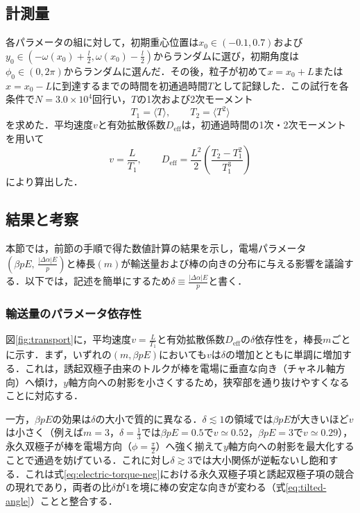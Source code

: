 \documentclass[dvipdfmx]{ampbt}
\begin{document}
  \subsection{計測量}
  各パラメータの組に対して，初期重心位置は$x_0\in(-0.1,0.7)$および$y_0\in(-\omega(x_0)+\frac{l}{2},\omega(x_0)-\frac{l}{2})$からランダムに選び，初期角度は$\phi_0\in(0,2\pi)$からランダムに選んだ．その後，粒子が初めて$x=x_0+L$または$x=x_0-L$に到達するまでの時間を初通過時間$T$として記録した．この試行を各条件で$N=3.0\times10^4$回行い，$T$の1次および2次モーメント
  \begin{equation}
    T_1=\langle T\rangle,\qquad
    T_2=\langle T^2\rangle
  \end{equation}
  を求めた．平均速度$v$と有効拡散係数$D_{\mathrm{eff}}$は，初通過時間の1次・2次モーメントを用いて\cite{schmid2008}
  \begin{equation}
    v=\frac{L}{T_1},\qquad
    D_{\mathrm{eff}}
    =
    \frac{L^2}{2}
    \left(
    \frac{T_2-T_1^2}{T_1^3}
    \right)
  \end{equation}
  により算出した．

  \subsection{結果と考察}
  \label{subsec:results}
  本節では，前節の手順で得た数値計算の結果を示し，電場パラメータ$\left(\beta pE,\,\frac{|\Delta\alpha|E}{p}\right)$と棒長$(m)$が輸送量および棒の向きの分布に与える影響を議論する．以下では，記述を簡単にするため$\delta\equiv\frac{|\Delta\alpha|E}{p}$と書く．

  \subsubsection{輸送量のパラメータ依存性}
  図\ref{fig:transport}に，平均速度$v=\frac{L}{T_1}$と有効拡散係数$D_{\mathrm{eff}}$の$\delta$依存性を，棒長$m$ごとに示す．まず，いずれの$(m,\beta pE)$においても$v$は$\delta$の増加とともに単調に増加する．これは，誘起双極子由来のトルクが棒を電場に垂直な向き（チャネル軸方向）へ傾け，$y$軸方向への射影を小さくするため，狭窄部を通り抜けやすくなることに対応する．

  一方，$\beta pE$の効果は$\delta$の大小で質的に異なる．$\delta\lesssim1$の領域では$\beta pE$が大きいほど$v$は小さく（例えば$m=3$，$\delta=\frac{1}{3}$では$\beta pE=0.5$で$v\simeq0.52$，$\beta pE=3$で$v\simeq0.29$），永久双極子が棒を電場方向（$\phi=\frac{\pi}{2}$）へ強く揃えて$y$軸方向への射影を最大化することで通過を妨げている．これに対し$\delta\gtrsim3$では大小関係が逆転ないし飽和する．これは式\eqref{eq:electric-torque-neg}における永久双極子項と誘起双極子項の競合の現れであり，両者の比$\delta$が$1$を境に棒の安定な向きが変わる（式\eqref{eq:tilted-angle}）ことと整合する．
\end{document}
